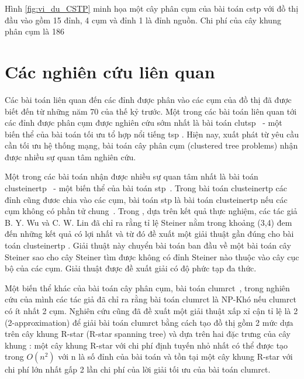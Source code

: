 Hình \ref{fig:vi_du_CSTP} minh họa một cây phân cụm của bài toán \gls{cstp} với đồ thị đầu vào gồm 15 đỉnh, 4 cụm và đỉnh 1 là đỉnh nguồn. Chi phí  của cây khung phân cụm là 186


\section{Các nghiên cứu liên quan} \label{chap_coso:sec:cacNghienCuuLienQuan}
Các bài toán liên quan đến các đỉnh được phân vào các cụm của đồ thị đã được biết đến từ những năm 70 của thế kỷ trước. Một trong các bài toán liên quan tới các đỉnh được phân cụm được nghiên cứu sớm nhất là bài toán \gls{clutsp}~\cite{bao_improved_2012, helsgaun_solving_2011, mestria_grasp_2013} - một biến thể của bài toán tối ưu tổ hợp nổi tiếng \gls{tsp} \cite{reinelt1994traveling}. Hiện nay, xuất phát từ yêu cầu cần tối ưu hệ thống mạng, bài toán cây phân cụm (clustered tree problems) nhận được nhiều sự quan tâm nghiên cứu.

Một trong các bài toán nhận được nhiều sự quan tâm nhất là bài toán \gls{clusteinertp}~\cite{wu_clustered_2015} - một biến thể của bài toán \gls{stp}~\cite{ihler_class_1999, winter1997euclidean}. Trong bài toán \gls{clusteinertp} các đỉnh cũng đươc chia vào các cụm, bài toán \gls{stp} là bài toán \gls{clusteinertp} nếu các cụm không có phần tử chung~\cite{wu2014clustered}. Trong \cite{wu_clustered_2015}, dựa trên kết quả thực nghiệm, các tác giả B. Y. Wu và C. W. Lin đã chỉ ra rằng tỉ lệ Steiner nằm trong khoảng (3,4) đem đến những kết quả có lợi nhất và từ đó đề xuất một giải thuật gần đúng cho bài toán \gls{clusteinertp} . Giải thuật này chuyển bài toán ban đầu về một bài toán cây Steiner sao cho cây Steiner tìm được không có đỉnh Steiner nào thuộc vào cây cục bộ của các cụm. Giải thuật được đề xuất giải có độ phức tạp đa thức.

Một biến thể khác của bài toán cây phân cụm, bài toán \gls{clumrct}~\cite{lin_minimum_2016}, trong nghiên cứu của mình các tác giả đã chỉ ra rằng bài toán \gls{clumrct} là NP-Khó nếu \gls{clumrct} có ít nhất 2 cụm. Nghiên cứu cũng đã đề xuất một giải thuật xấp xỉ cận tỉ lệ là 2 (2-approximation) để giải bài toán \gls{clumrct} bằng cách tạo đồ thị gồm 2 mức dựa trên cây khung R-star (R-star spanning tree) và dựa trên hai đặc trưng của cây khung : một cây khung R-star với chi phí định tuyến nhỏ nhất có thể được tạo trong $O(n^2)$ với n là số đỉnh của bài toán và tồn tại một cây khung R-star với chi phí lớn nhất gấp 2 lần chi phí của lời giải tối ưu của bài toán \gls{clumrct}.


